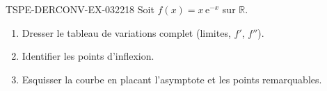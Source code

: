 \begin{exercice}{TSPE-DERCONV-EX-032}{2}{18}
Soit $f(x) = x\,\mathrm{e}^{-x}$ sur $\mathbb{R}$.
\begin{enumerate}
  \item Dresser le tableau de variations complet (limites, $f'$, $f''$).
  \item Identifier les points d'inflexion.
  \item Esquisser la courbe en placant l'asymptote et les points remarquables.
\end{enumerate}

\end{exercice}
